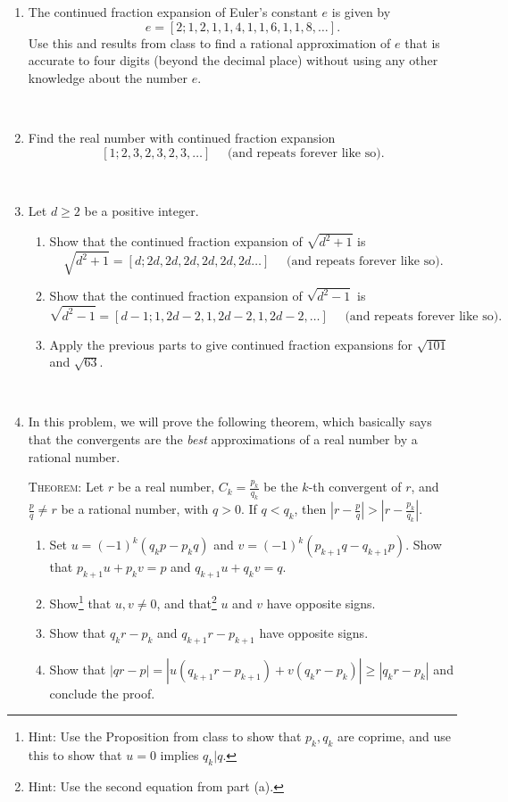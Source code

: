 \documentclass{amsart}
\begin{document}
\begin{enumerate}

\item The continued fraction expansion of Euler's constant $e$ is given by
\[ e = [2;1,2,1,1,4,1,1,6,1,1,8, \dots].\]
Use this and results from class to find a rational approximation of $e$ that is accurate to four digits (beyond the decimal place) without using any other knowledge about the number $e$.

\


\item Find the real number with continued fraction expansion 
\[[1; 2,3,2,3,2,3,\dots]\quad \text{ (and repeats forever like so).}\]

\

\item Let $d\geq  2$ be a positive integer. \begin{enumerate}
\item Show that the continued fraction expansion of $\sqrt{d^2+1}$ is 
\[\sqrt{d^2+1}=  [d; 2d, 2d, 2d, 2d, 2d, 2d \dots]\quad \text{ (and repeats forever like so).}\]

\item Show that the continued fraction expansion of $\sqrt{d^2-1}$ is 
\[\sqrt{d^2-1} = [d-1; 1,  2d-2, 1, 2d-2, 1, 2d-2, \dots] \quad \text{ (and repeats forever like so).}\]
\item Apply the previous parts to give continued fraction expansions for $\sqrt{101}$ and $\sqrt{63}$.
\end{enumerate}


\


\item In this problem, we will prove the following theorem, which basically says that the convergents are the \emph{best} approximations of a real number by a rational number. 

\noindent \textsc{Theorem:} Let $r$ be a real number, $C_k= \frac{p_k}{q_k}$ be the $k$-th convergent of $r$, and $\frac{p}{q}\neq r$ be a rational number, with $q>0$. If $q < q_k$, then  $\displaystyle \left| r-\frac{p}{q} \right| > \left| r-\frac{p_k}{q_k} \right|$.

\begin{enumerate} 
\item Set $u=(-1)^k (q_k p -  p_k q)$ and $v=(-1)^k( p_{k+1} q - q_{k+1} p)$. Show that $p_{k+1} u + p_{k} v = p$ and $q_{k+1} u + q_{k} v = q$.
\item Show\footnote{Hint: Use the Proposition from class to show that $p_{k}, q_{k}$ are coprime, and use this to show that $u=0$ implies $q_{k} | q$.} that $u,v\neq 0$, and that\footnote{Hint: Use the second equation from part (a).} $u$ and $v$ have opposite signs.
\item Show that $q_k r - p_k$ and $q_{k+1} r - p_{k+1}$ have opposite signs.
\item Show that $|q r - p| = |u (q_{k+1} r - p_{k+1}) + v(q_{k} r - p_{k})| \geq |q_k r - p_k|$ and conclude the proof.
\end{enumerate}

\end{enumerate}
\end{document}
